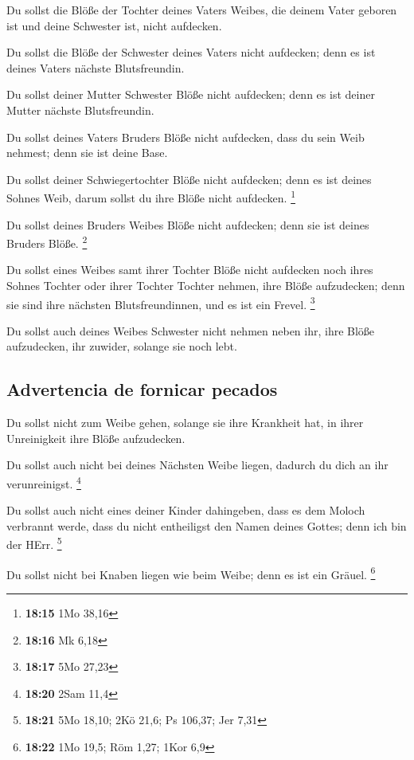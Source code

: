  Du sollst die Blöße der Tochter deines Vaters Weibes,
die deinem Vater geboren ist und deine Schwester ist, nicht aufdecken.

 Du sollst die Blöße der Schwester deines Vaters nicht
aufdecken; denn es ist deines Vaters nächste Blutsfreundin.

 Du sollst deiner Mutter Schwester Blöße nicht aufdecken;
denn es ist deiner Mutter nächste Blutsfreundin.

 Du sollst deines Vaters Bruders Blöße nicht aufdecken,
dass du sein Weib nehmest; denn sie ist deine Base.

 Du sollst deiner Schwiegertochter Blöße nicht aufdecken;
denn es ist deines Sohnes Weib, darum sollst du ihre Blöße nicht
aufdecken. \footnote{\textbf{18:15} 1Mo 38,16}

 Du sollst deines Bruders Weibes Blöße nicht aufdecken;
denn sie ist deines Bruders Blöße. \footnote{\textbf{18:16} Mk 6,18}

 Du sollst eines Weibes samt ihrer Tochter Blöße nicht
aufdecken noch ihres Sohnes Tochter oder ihrer Tochter Tochter nehmen,
ihre Blöße aufzudecken; denn sie sind ihre nächsten Blutsfreundinnen,
und es ist ein Frevel. \footnote{\textbf{18:17} 5Mo 27,23}

 Du sollst auch deines Weibes Schwester nicht nehmen
neben ihr, ihre Blöße aufzudecken, ihr zuwider, solange sie noch lebt.

\hypertarget{advertencia-de-fornicar-pecados}{%
\subsection{Advertencia de fornicar
pecados}\label{advertencia-de-fornicar-pecados}}

 Du sollst nicht zum Weibe gehen, solange sie ihre
Krankheit hat, in ihrer Unreinigkeit ihre Blöße aufzudecken.

 Du sollst auch nicht bei deines Nächsten Weibe liegen,
dadurch du dich an ihr verunreinigst. \footnote{\textbf{18:20} 2Sam 11,4}

 Du sollst auch nicht eines deiner Kinder dahingeben,
dass es dem Moloch verbrannt werde, dass du nicht entheiligst den Namen
deines Gottes; denn ich bin der HErr. \footnote{\textbf{18:21} 5Mo
  18,10; 2Kö 21,6; Ps 106,37; Jer 7,31}

 Du sollst nicht bei Knaben liegen wie beim Weibe; denn
es ist ein Gräuel. \footnote{\textbf{18:22} 1Mo 19,5; Röm 1,27; 1Kor 6,9}

